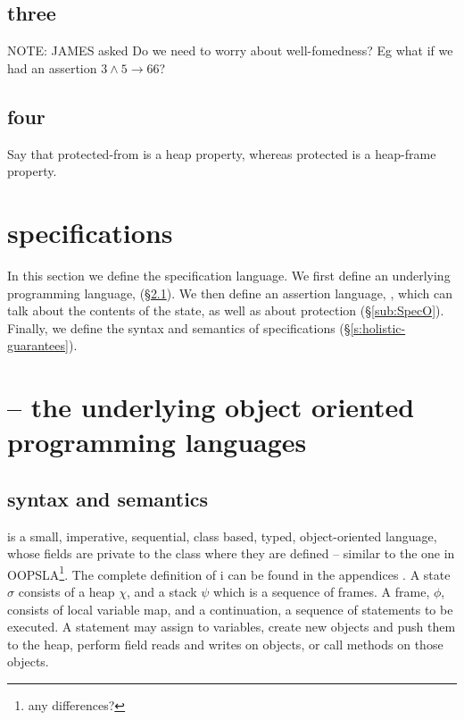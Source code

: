 \subsection{three}
NOTE: JAMES asked Do we need to worry about well-fomedness? Eg what if we had an assertion $3 \wedge 5 \rightarrow 66$?

\subsection{four}
Say that protected-from is a heap property, whereas protected is a heap-frame property.

\section{\SpecLang specifications}
\label{s:semantics}

 
In this section we define {the}  \SpecLang specification language.  
We first define an underlying programming language, \LangOO (\S \ref{sub:Loo}).
We then define an assertion language, \AssertLang, which can talk about the
contents of the state, as well as about protection (\S \ref{sub:SpecO}).  Finally, we define the syntax and
semantics of  \SpecLang
specifications (\S \ref{s:holistic-guarantees}).

 


\section{\LangOO -- the underlying object oriented programming languages}

\subsection{\LangOO syntax and semantics}
\label{sub:Loo} 
 \LangOO  is a {small}, imperative, sequential, 
class based, typed, object-oriented language, whose
fields are private to the class where they are defined -- similar to the one in OOPSLA\footnote{any differences?}.
The complete definition of \LangOO i 
{can be found in the appendices  \cite{necessityFull}.}
 A \LangOO state $\sigma$ consists of a 
heap $\chi$, and a  {stack $\psi$ which is a sequence of frames}.
A frame, $\phi$, consists of
local variable map, and a continuation, \ie a sequence of statements to be executed.
 A statement may assign to variables, create new objects and push them to the heap, 
perform field reads and writes on objects,  or
 call methods on those objects. 

